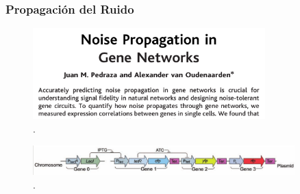 \documentclass[10pt]{beamer}
\begin{document}

\begin{frame}
\frametitle{Propagaci\'on del Ruido}
\begin{figure}[p]
    \centering
    \includegraphics[width=0.8\textwidth]{pedtitle.png}\\
    \tiny \cite{pedraza05}.
\end{figure}

\begin{figure}[p]
    \centering
    \includegraphics[width=0.9\textwidth]{circuitex.png}\\
    \tiny \cite{pedraza05}.
\end{figure}

\end{frame}
\end{document}
